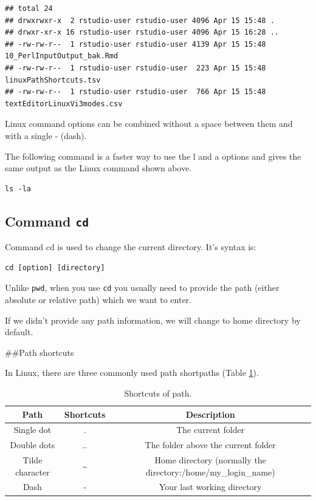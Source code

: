 \documentclass[]{book}
\begin{document}
\begin{verbatim}
## total 24
## drwxrwxr-x  2 rstudio-user rstudio-user 4096 Apr 15 15:48 .
## drwxr-xr-x 16 rstudio-user rstudio-user 4096 Apr 15 16:28 ..
## -rw-rw-r--  1 rstudio-user rstudio-user 4139 Apr 15 15:48 10_PerlInputOutput_bak.Rmd
## -rw-rw-r--  1 rstudio-user rstudio-user  223 Apr 15 15:48 linuxPathShortcuts.tsv
## -rw-rw-r--  1 rstudio-user rstudio-user  766 Apr 15 15:48 textEditorLinuxVi3modes.csv
\end{verbatim}

Linux command options can be combined without a space between them and with a single - (dash).

The following command is a faster way to use the l and a options and gives the same output as the Linux command shown above.

\begin{verbatim}
ls -la 
\end{verbatim}

\hypertarget{command-cd}{%
\subsection{\texorpdfstring{Command \texttt{cd}}{Command cd}}\label{command-cd}}

Command cd is used to change the current directory. It's syntax is:

\begin{verbatim}
cd [option] [directory]
\end{verbatim}

Unlike \texttt{pwd}, when you use \texttt{cd} you usually need to provide the path (either absolute or relative path) which we want to enter.

If we didn't provide any path information, we will change to home directory by default.

\#\#Path shortcuts

In Linux, there are three commonly used path shortpaths (Table \ref{tab:linuxPathShortcuts}).



\begin{table}[t]

\caption{\label{tab:linuxPathShortcuts}Shortcuts of path.}
\centering
\begin{tabular}{c|c|c}
\hline
Path & Shortcuts & Description\\
\hline
Single dot & . & The current folder\\
\hline
Double dots & .. & The folder above the current folder\\
\hline
Tilde character & \textasciitilde{} & Home directory (normally the directory:/home/my\_login\_name)\\
\hline
Dash & - & Your last working directory\\
\hline
\end{tabular}
\end{table}
\end{document}
